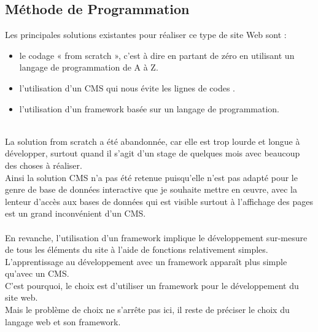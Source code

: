 \documentclass[12pt]{article}
\begin{document}
\subsection{Méthode de Programmation }

Les principales solutions existantes pour réaliser ce type de site Web sont :
\begin{itemize}
\item le codage « from scratch », c'est à dire en partant de zéro en utilisant un langage de programmation de A à Z.
\item l'utilisation d'un CMS qui  nous évite les lignes de codes .
\item l'utilisation d'un framework basée sur un langage de programmation.
\end{itemize} \\
La solution from scratch a été abandonnée, car elle est trop lourde et longue à
développer, surtout quand il s'agit d'un stage de quelques mois avec beaucoup des choses à réaliser.\\ 
Ainsi la solution CMS n'a pas été retenue puisqu'elle n'est pas adapté pour le genre de base de données interactive que 
je souhaite mettre en œuvre, avec la lenteur d'accès aux bases de données qui est visible surtout à l'affichage des pages
est un grand inconvénient d'un CMS.\\ \\

En revanche, l'utilisation d'un framework implique le développement sur-mesure de
tous les éléments du site à l'aide de fonctions relativement simples. L'apprentissage au
développement avec un framework apparaît plus simple qu'avec un CMS.\\

C'est pourquoi, le choix est d'utiliser un framework pour le développement du site web.\\

Mais le problème de choix ne s’arrête pas ici, il reste de préciser le choix du langage web et son framework.
 
\end{document}

